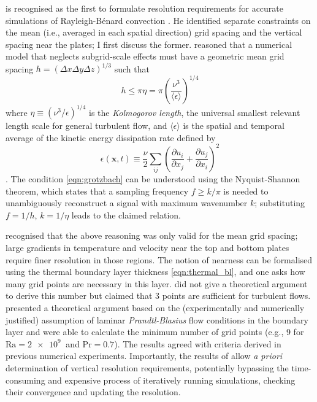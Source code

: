 \documentclass[titlepage,twoside]{article}
\numberwithin{equation}{section}
\newcommand{\pdiff}[2]{\frac{\partial #1}{\partial #2}}
\renewcommand\vec{\bm}
\newcommand{\prandtl}{\ensuremath{\mathrm{Pr}}}
\newcommand{\rayleigh}{\ensuremath{\mathrm{Ra}}}
\newcommand{\rb}{Rayleigh-B\'{e}nard}
\begin{document}
\textcite{grotzbach1983} is recognised as the first to formulate resolution
requirements for accurate simulations of \rb{} convection
\parencite{chilla2012,scheel2013}. He identified separate constraints on the
mean (i.e., averaged in each spatial direction) grid spacing and the vertical
spacing near the plates; I first discuss the former.
\citeauthor{grotzbach1983} reasoned that a numerical model that neglects
subgrid-scale effects must have a geometric mean grid spacing $h = (\Delta x
\Delta y \Delta z)^{1/3}$ such that
\begin{equation}
    \label{eqn:grotzbach}
    h \leq \pi \eta = \pi \left(
        \frac{\nu^3}{\langle \epsilon \rangle}
    \right)^{1/4}
\end{equation}
where $\eta \equiv (\nu^3/\epsilon)^{1/4}$ is the \emph{Kolmogorov length}, the
universal smallest relevant length scale for general turbulent flow, and
$\langle \epsilon \rangle$ is the spatial and temporal average of the kinetic
energy dissipation rate defined by
\begin{equation}
    \label{eqn:kinetic_dissipation}
    \epsilon(\vec{x}, t) \equiv \frac{\nu}{2} \sum_{ij} \left(
        \pdiff{u_i}{x_j} + \pdiff{u_j}{x_i}
    \right)^2
\end{equation}
\parencite{chilla2012}. The condition \cref{eqn:grotzbach} can be
understood using the Nyquist-Shannon theorem, which states that a
sampling frequency $f \geq k/\pi$ is needed to unambiguously reconstruct
a signal with maximum wavenumber $k$; substituting $f = 1/h$, $k =
1/\eta$ leads to the claimed relation.

\citeauthor{grotzbach1983} recognised that the above reasoning was only valid
for the mean grid spacing; large gradients in temperature and velocity near the
top and bottom plates require finer resolution in those regions. The notion of
nearness can be formalised using the thermal boundary layer thickness
\cref{eqn:thermal_bl}, and one asks how many grid points are necessary in this
layer. \citeauthor{grotzbach1983} did not give a theoretical argument to derive
this number but claimed that 3 points are sufficient for turbulent flows.
\textcite{shishkina2010} presented a theoretical argument based on the
(experimentally and numerically justified) assumption of laminar
\emph{Prandtl-Blasius} flow conditions in the boundary layer and were able to
calculate the minimum number of grid points (e.g., 9 for $\rayleigh =
\SI{2e9}{}$ and $\prandtl = 0.7$). The results agreed with criteria derived in
previous numerical experiments. Importantly, the results of
\citeauthor{shishkina2010} allow \emph{a priori} determination of vertical
resolution requirements, potentially bypassing the time-consuming and expensive
process of iteratively running simulations, checking their convergence and
updating the resolution.
\end{document}
